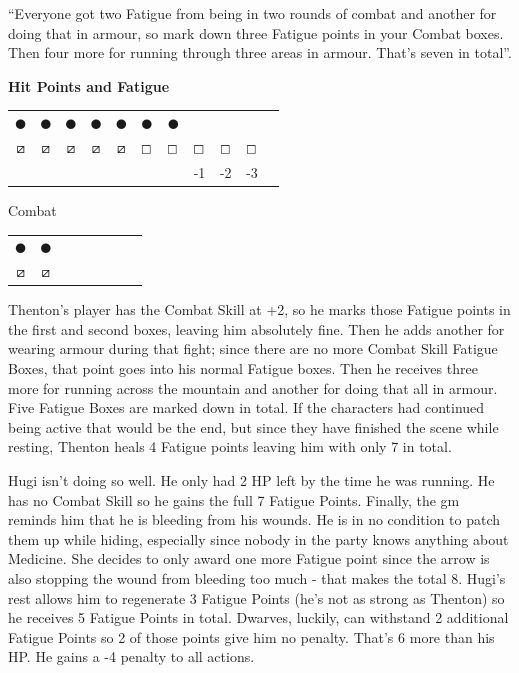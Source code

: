 \begin{multicols}{2}
{\begin{exampletext}
		``Everyone got two Fatigue from being in two \glspl{round} of combat and another for doing that in armour, so mark down three Fatigue points in your Combat boxes. Then four more for running through three areas in armour. That's seven in total''.

\vspace{1em}

\textbf{Hit Points and Fatigue}

	\begin{tabularx}{\linewidth}{ccccccccccc}

		$\CIRCLE$ & $\CIRCLE$ & $\CIRCLE$ & $\CIRCLE$ & $\CIRCLE$ & $\CIRCLE$ & $\CIRCLE$ & \Circle & \Circle & \Circle \\ 

		$\boxslash$ & $\boxslash$ & $\boxslash$ & $\boxslash$ & $\boxslash$ & $\boxempty$ & $\boxempty$ & $\boxempty$ & $\boxempty$ & $\boxempty$ \\ 

		&&&&&&& -1 & -2 & -3 \\

	\end{tabularx}

	Combat 

	\begin{tabularx}{.4\textwidth}{cccccccc}


		$\CIRCLE$ & $\CIRCLE$ \\ 

		$\boxslash$ & $\boxslash$ \\ 

	\end{tabularx}

\vspace{1em}

	Thenton's player has the Combat Skill at +2, so he marks those Fatigue points in the first and second boxes, leaving him absolutely fine. Then he adds another for wearing armour during that fight; since there are no more Combat Skill Fatigue Boxes, that point goes into his normal Fatigue boxes. Then he receives three more for running across the mountain and another for doing that all in armour. Five Fatigue Boxes are marked down in total. If the characters had continued being active that would be the end, but since they have finished the scene while resting, Thenton heals 4 Fatigue points leaving him with only 7 in total.

	Hugi isn't doing so well. He only had 2 HP left by the time he was running. He has no Combat Skill so he gains the full 7 Fatigue Points. Finally, the \gls{gm} reminds him that he is bleeding from his wounds. He is in no condition to patch them up while hiding, especially since nobody in the party knows anything about Medicine. She decides to only award one more Fatigue point since the arrow is also stopping the wound from bleeding too much - that makes the total 8. Hugi's rest allows him to regenerate 3 Fatigue Points (he's not as strong as Thenton) so he receives 5 Fatigue Points in total. Dwarves, luckily, can withstand 2 additional Fatigue Points so 2 of those points give him no penalty. That's 6 more than his HP. He gains a -4 penalty to all actions.


\end{exampletext}}
\end{multicols}
